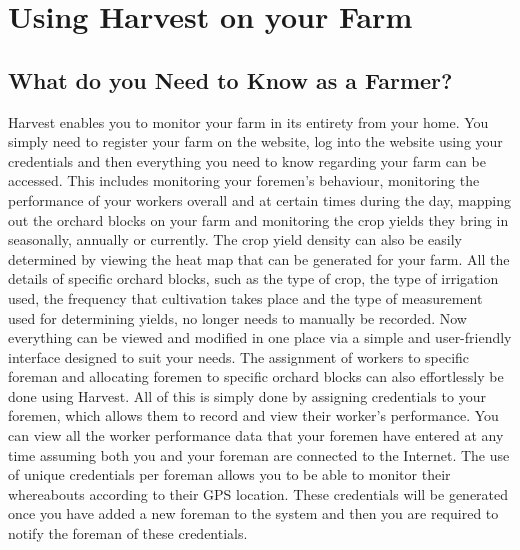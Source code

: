 \documentclass[11pt,fleqn]{book} %
\begin{document}
\chapter{Using Harvest on your Farm}
	\section{What do you Need to Know as a Farmer?}
		
		Harvest enables you to monitor your farm in its entirety from your home. You simply need to register your farm on the website, log into the website using your credentials and then everything you need to know regarding your farm can be accessed. This includes monitoring your foremen's behaviour, monitoring the performance of your workers overall and at certain times during the day, mapping out the orchard blocks on your farm and monitoring the crop yields they bring in seasonally, annually or currently. The crop yield density can also be easily determined by viewing the heat map that can be generated for your farm. All the details of specific orchard blocks, such as the type of crop, the type of irrigation used, the frequency that cultivation takes place and the type of measurement used for determining yields, no longer needs to manually be recorded. Now everything can be viewed and modified in one place via a simple and user-friendly interface designed to suit your needs. The assignment of workers to specific foreman and allocating foremen to specific orchard blocks can also effortlessly be done using Harvest. All of this is simply done by assigning credentials to your foremen, which allows them to record and view their worker's performance. You can view all the worker performance data that your foremen have entered at any time assuming both you and your foreman are connected to the Internet. The use of unique credentials per foreman allows you to be able to monitor their whereabouts according to their GPS location. These credentials will be generated once you have added a new foreman to the system and then you are required to notify the foreman of these credentials.\newline\newline
		
\end{document}
